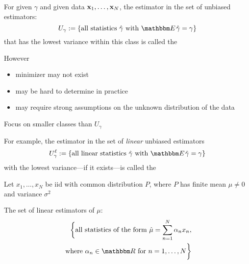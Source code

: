 \begin{frame}

    \vspace{2em}
    For given $\gamma$
    and given data ${\mathbf x}_1,\ldots,{\mathbf x}_N$, the estimator in
    the set of unbiased estimators:
    \begin{equation*}
        U_{\gamma} := \{\text{all statistics } \hgamma
            \text{ with } \EE \hgamma = \gamma\}
    \end{equation*}
    that has the lowest variance within this class is called the 
    
\end{frame}

\begin{frame}

    \vspace{2em}
    However
    
    \begin{itemize}
        \item minimizer may not exist
        \item may be hard to determine in practice
        \item may require strong assumptions on the
    unknown distribution of the data
    \end{itemize}
    
    \vspace{.7em}
    Focus on
    smaller classes than $U_{\gamma}$
    
    For example, the estimator in the set of \emph{linear} unbiased estimators
    \begin{equation*}
        U^{\ell}_{\gamma} := \{\text{all linear statistics } \hgamma 
            \text{ with } \EE \hgamma = \gamma\}
    \end{equation*}
    with the lowest variance---if it exists---is called the  
    
\end{frame}

\begin{frame}

    \vspace{2em}
    \Eg
    Let $x_1,\ldots,x_N$ be {\sc iid} with common distribution $P$, where $P$
    has finite mean $\mu \not= 0$ and variance $\sigma^2$
    
    The set of linear
    estimators of $\mu$:
    \begin{align*}
        \bigg\{ 
        \text{all statistics of the form } 
        \hat \mu = \sum_{n=1}^N \alpha_n x_n, \\ \text{ where }
        \alpha_n \in \RR \text{ for } n = 1,\ldots,N
        \bigg\}
    \end{align*}

\end{frame}

